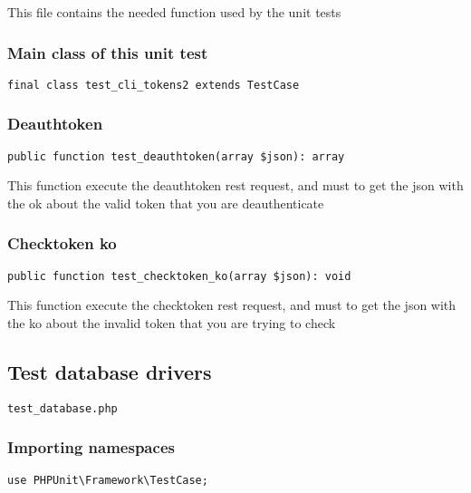 \documentclass[a4paper]{article}
\begin{document}
This file contains the needed function used by the unit tests

\hypertarget{toc40}{}
\subsubsection{Main class of this unit test}

\begin{lstlisting}
final class test_cli_tokens2 extends TestCase
\end{lstlisting}

\hypertarget{toc41}{}
\subsubsection{Deauthtoken}

\begin{lstlisting}
public function test_deauthtoken(array $json): array
\end{lstlisting}

This function execute the deauthtoken rest request, and must to get the
json with the ok about the valid token that you are deauthenticate

\hypertarget{toc42}{}
\subsubsection{Checktoken ko}

\begin{lstlisting}
public function test_checktoken_ko(array $json): void
\end{lstlisting}

This function execute the checktoken rest request, and must to get the
json with the ko about the invalid token that you are trying to check

\hypertarget{toc43}{}
\subsection{Test database drivers}

\begin{lstlisting}
test_database.php
\end{lstlisting}

\hypertarget{toc44}{}
\subsubsection{Importing namespaces}

\begin{lstlisting}
use PHPUnit\Framework\TestCase;
\end{lstlisting}
\end{document}
